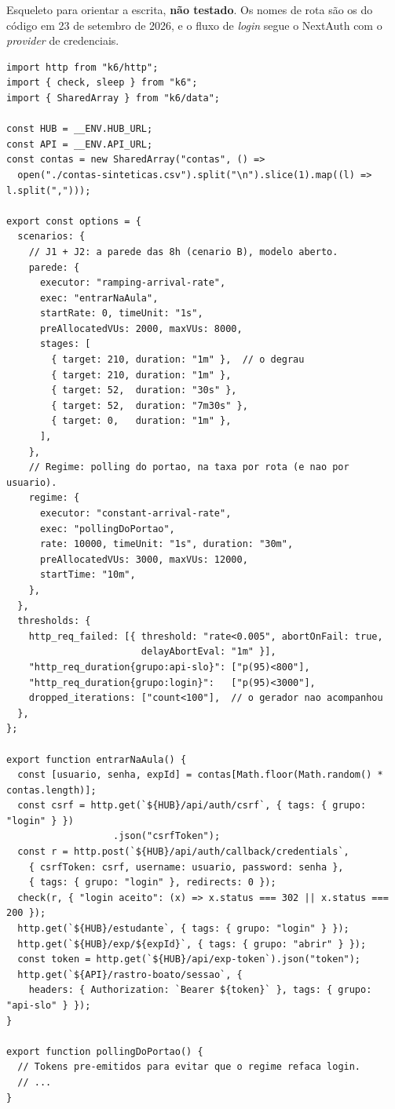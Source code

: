 \documentclass[11pt, a4paper, oneside, openany]{report}
\begin{document}
Esqueleto para orientar a escrita, \textbf{não testado}. Os nomes de rota são
os do código em 23 de setembro de 2026, e o fluxo de \emph{login} segue o
NextAuth com o \emph{provider} de credenciais.

\begin{lstlisting}[language=tsunoo]
import http from "k6/http";
import { check, sleep } from "k6";
import { SharedArray } from "k6/data";

const HUB = __ENV.HUB_URL;
const API = __ENV.API_URL;
const contas = new SharedArray("contas", () =>
  open("./contas-sinteticas.csv").split("\n").slice(1).map((l) => l.split(",")));

export const options = {
  scenarios: {
    // J1 + J2: a parede das 8h (cenario B), modelo aberto.
    parede: {
      executor: "ramping-arrival-rate",
      exec: "entrarNaAula",
      startRate: 0, timeUnit: "1s",
      preAllocatedVUs: 2000, maxVUs: 8000,
      stages: [
        { target: 210, duration: "1m" },  // o degrau
        { target: 210, duration: "1m" },
        { target: 52,  duration: "30s" },
        { target: 52,  duration: "7m30s" },
        { target: 0,   duration: "1m" },
      ],
    },
    // Regime: polling do portao, na taxa por rota (e nao por usuario).
    regime: {
      executor: "constant-arrival-rate",
      exec: "pollingDoPortao",
      rate: 10000, timeUnit: "1s", duration: "30m",
      preAllocatedVUs: 3000, maxVUs: 12000,
      startTime: "10m",
    },
  },
  thresholds: {
    http_req_failed: [{ threshold: "rate<0.005", abortOnFail: true,
                        delayAbortEval: "1m" }],
    "http_req_duration{grupo:api-slo}": ["p(95)<800"],
    "http_req_duration{grupo:login}":   ["p(95)<3000"],
    dropped_iterations: ["count<100"],  // o gerador nao acompanhou
  },
};

export function entrarNaAula() {
  const [usuario, senha, expId] = contas[Math.floor(Math.random() * contas.length)];
  const csrf = http.get(`${HUB}/api/auth/csrf`, { tags: { grupo: "login" } })
                   .json("csrfToken");
  const r = http.post(`${HUB}/api/auth/callback/credentials`,
    { csrfToken: csrf, username: usuario, password: senha },
    { tags: { grupo: "login" }, redirects: 0 });
  check(r, { "login aceito": (x) => x.status === 302 || x.status === 200 });
  http.get(`${HUB}/estudante`, { tags: { grupo: "login" } });
  http.get(`${HUB}/exp/${expId}`, { tags: { grupo: "abrir" } });
  const token = http.get(`${HUB}/api/exp-token`).json("token");
  http.get(`${API}/rastro-boato/sessao`, {
    headers: { Authorization: `Bearer ${token}` }, tags: { grupo: "api-slo" } });
}

export function pollingDoPortao() {
  // Tokens pre-emitidos para evitar que o regime refaca login.
  // ...
}
\end{lstlisting}
\end{document}

